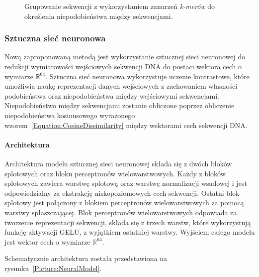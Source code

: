 \begin{figure}[!htb]
\begin{center}
{                    %
                    }
                \end{center}
                \caption{
                    Grupowanie sekwencji z wykorzystaniem zanurzeń \textit{k-merów} do określenia niepodobieństwa między sekwencjami.
                }\label{Picture:Cluster:KMer}
            \end{figure}

        \subsubsection{Sztuczna sieć neuronowa}

            Nową zaproponowaną metodą jest wykorzystanie sztucznej sieci neuronowej do redukcji wymiarowości wejściowych sekwencji DNA do postaci wektora cech o wymiarze $\mathbb{R}^{64}$. Sztuczna sieć neuronowa wykorzystuje uczenie kontrastowe, które umożliwia naukę reprezentacji danych wejściowych z zachowaniem własności podobieństwa oraz niepodobieństwa między wejściowymi sekwencjami. Niepodobieństwo między sekwencjami zostanie obliczone poprzez obliczenie niepodobieństwa kosinusowego wyrażonego wzorem~\eqref{Equation:CosineDissimilarity} między wektorami cech sekwencji DNA.

            \paragraph{Architektura}
                Architektura modelu sztucznej sieci neuronowej składa się z dwóch bloków splotowych oraz bloku perceptronów wielowarstwowych. Każdy z bloków splotowych zawiera warstwę splotową oraz warstwę normalizacji wsadowej i jest odpowiedzialny za ekstrakcję niskopoziomowych cech sekwencji. Ostatni blok splotowy jest połączony z blokiem perceptronów wielowarstwowych za pomocą warstwy spłaszczającej. Blok perceptronów wielowarstwowych odpowiada za tworzenie reprezentacji sekwencji, składa się z trzech warstw, które wykorzystują funkcję aktywacji GELU\cite{Hendrycks:2016}, z wyjątkiem ostatniej warstwy. Wyjściem całego modelu jest wektor cech o wymiarze $\mathbb{R}^{64}$.

                Schematycznie architektura została przedstawiona na rysunku~\ref{Picture:NeuralModel}.

